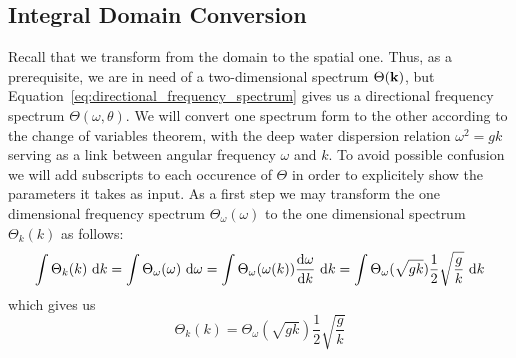 \subsection{Integral Domain Conversion}
\label{subsec:integral_domain_conversion}
%
Recall that we transform from the  \wavenumber domain to the spatial 
one. Thus, as a prerequisite, we are in need of a two-dimensional \wavenumber 
spectrum $\Theta(\mathbf{k})$, but 
Equation~\ref{eq:directional_frequency_spectrum} 
gives us a directional frequency spectrum $\Theta(\omega,\theta)$. We will 
convert one spectrum form to the other according to the change of variables
theorem, with the deep water dispersion relation $\omega^2=gk$
serving as a link between angular frequency $\omega$ and \wavenumber $k$. To 
avoid possible confusion we will add subscripts to each occurence of $\Theta$ 
in order to explicitely show the parameters it takes as input.
As a first step we may transform the one dimensional frequency spectrum 
$\Theta_{\omega}(\omega)$ to the one dimensional \wavenumber 
spectrum $\Theta_k(k)$ as follows:
\begin{equation*}
 \int\Theta_k(k)~\mathrm{d}k = \int\Theta_{\omega}(\omega)~\mathrm{d}\omega\\ = 
\int\Theta_{\omega}(\omega(k))\frac{\mathrm{d}\omega}{\mathrm{d}k}~\mathrm{d}k
= \int\Theta_{\omega}(\sqrt{gk})\frac{1}{2}\sqrt{\frac{g}{k}}~\mathrm{d}k
\end{equation*}
which gives us
\begin{equation}
\label{eq:theta_k}
 \Theta_k(k) = \Theta_{\omega}(\sqrt{gk})\frac{1}{2}\sqrt{\frac{g}{k}}
\end{equation}

